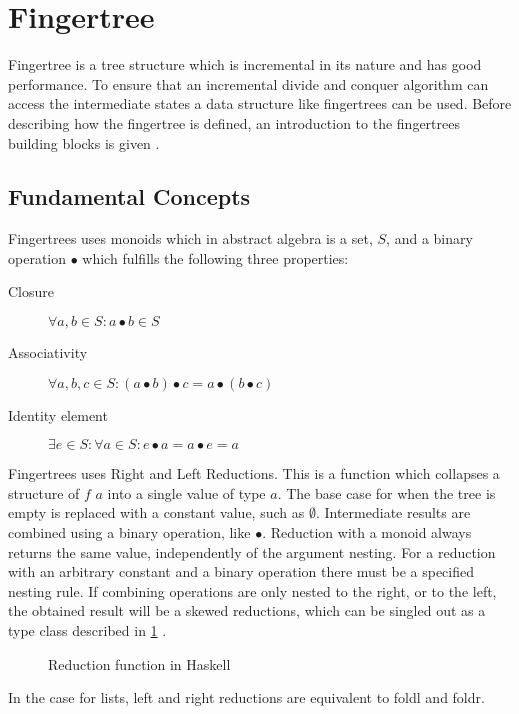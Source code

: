 \section{Fingertree}
Fingertree is a tree structure which is incremental in its nature and has good
performance. To ensure that an incremental divide and conquer algorithm can
access the intermediate states a data structure like fingertrees can be used.
Before describing how the fingertree is defined, an introduction to the
fingertrees building blocks is given \cite{fingertree}.

\subsection{Fundamental Concepts}

Fingertrees uses monoids which in abstract algebra is a set, $S$, and a binary
operation $\bullet$ which fulfills the following
three properties:
\begin{description}
\item[Closure] $\forall a,b \in S: a \bullet b \in S$
\item[Associativity] $\forall a,b,c \in S: (a \bullet b) \bullet c = a \bullet
    (b \bullet c)$ 
\item[Identity element] $\exists e \in S: \forall a \in S: e \bullet a = a
    \bullet e = a$
\end{description}

Fingertrees uses Right and Left Reductions. This is a function which
collapses a structure of $f$ $a$ into a single value of type $a$. The base case
for when the tree is empty is replaced with a constant value, such as 
$\emptyset$. Intermediate results are combined using a binary operation, like
$\bullet$. Reduction with a monoid always returns the same value,
independently of the argument nesting. For a reduction with an arbitrary
constant and a binary operation there must be a specified nesting rule. If
combining operations are only nested to the right, or to the left, the obtained
result will be a skewed reductions, which can be singled out as a type class
described in \cref{fig:Reduction} \cite{fingertree}.

\begin{figure}[h!]

\caption{Reduction function in Haskell \label{fig:Reduction}}
\end{figure}

In the case for lists, left and right reductions are equivalent to foldl and foldr.

